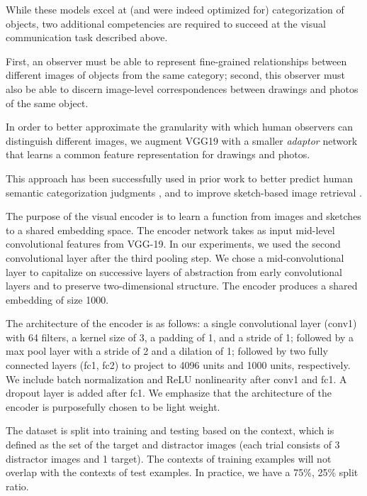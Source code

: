 \documentclass[9pt,twocolumn,twoside]{pnas-new}
\begin{document}
{While these models excel at (and were indeed optimized for) categorization of objects, two additional competencies are required to succeed at the visual communication task described above.

First, an observer must be able to represent fine-grained relationships between different images of objects from the same category; second, this observer must also be able to discern image-level correspondences between drawings and photos of the same object.

In order to better approximate the granularity with which human observers can distinguish different images, we augment VGG19 with a smaller \textit{adaptor} network that learns a common feature representation for drawings and photos.

This approach has been successfully used in prior work to better predict human semantic categorization judgments \cite[]{peterson2016adapting}, and to improve sketch-based image retrieval \cite[]{sangkloy2016sketchy}.

The purpose of the visual encoder is to learn a function from images and sketches to a shared embedding space. The encoder network takes as input mid-level convolutional features from VGG-19. In our experiments, we used the second convolutional layer after the third pooling step. We chose a mid-convolutional layer to capitalize on successive layers of abstraction from early convolutional layers and to preserve two-dimensional structure. The encoder produces a shared embedding of size 1000.

The architecture of the encoder is as follows: a single convolutional layer (conv1) with 64 filters, a kernel size of 3, a padding of 1, and a stride of 1; followed by a max pool layer with a stride of 2 and a dilation of 1; followed by two fully connected layers (fc1, fc2) to project to 4096 units and 1000 units, respectively. We include batch normalization and ReLU nonlinearity after conv1 and fc1. A dropout layer is added after fc1. We emphasize that the architecture of the encoder is purposefully chosen to be light weight.


The dataset is split into training and testing based on the context, which is defined as the set of the target and distractor images (each trial consists of 3 distractor images and 1 target). The contexts of training examples will not overlap with the contexts of test examples. In practice, we have a 75\%, 25\% split ratio.

}
\end{document}
